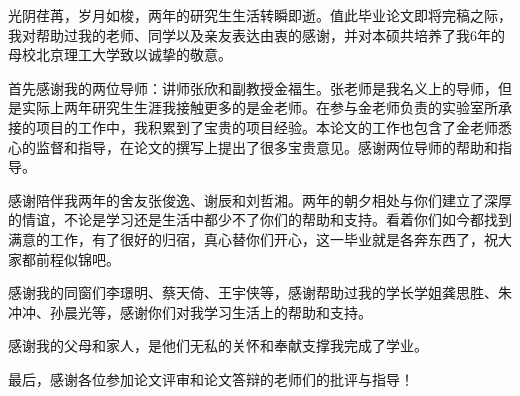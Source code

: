 
\begin{thanks}

光阴荏苒，岁月如梭，两年的研究生生活转瞬即逝。值此毕业论文即将完稿之际，我对帮助过我的老师、同学以及亲友表达由衷的感谢，并对本硕共培养了我6年的母校北京理工大学致以诚挚的敬意。

首先感谢我的两位导师：讲师张欣和副教授金福生。张老师是我名义上的导师，但是实际上两年研究生生涯我接触更多的是金老师。在参与金老师负责的实验室所承接的项目的工作中，我积累到了宝贵的项目经验。本论文的工作也包含了金老师悉心的监督和指导，在论文的撰写上提出了很多宝贵意见。感谢两位导师的帮助和指导。

感谢陪伴我两年的舍友张俊逸、谢辰和刘哲湘。两年的朝夕相处与你们建立了深厚的情谊，不论是学习还是生活中都少不了你们的帮助和支持。看着你们如今都找到满意的工作，有了很好的归宿，真心替你们开心，这一毕业就是各奔东西了，祝大家都前程似锦吧。

感谢我的同窗们李璟明、蔡天倚、王宇侠等，感谢帮助过我的学长学姐龚思胜、朱冲冲、孙晨光等，感谢你们对我学习生活上的帮助和支持。


感谢我的父母和家人，是他们无私的关怀和奉献支撑我完成了学业。

最后，感谢各位参加论文评审和论文答辩的老师们的批评与指导！
\end{thanks}
